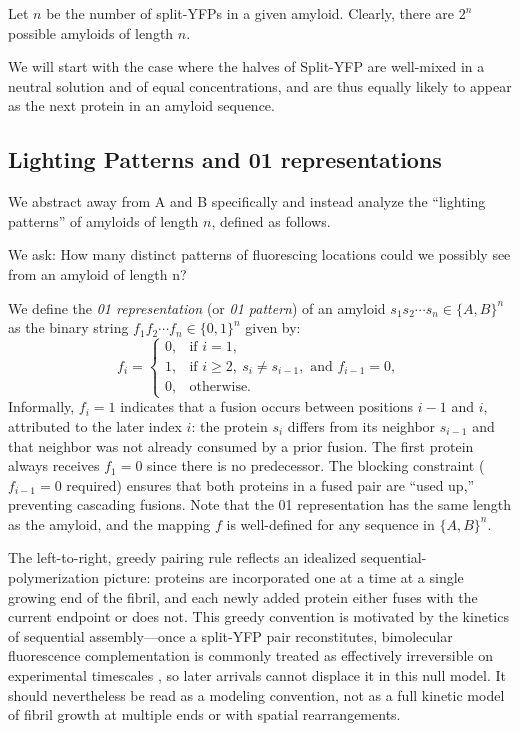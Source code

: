 \documentclass[11pt]{article}
\begin{document}
Let $n$ be the number of split-YFPs in a given amyloid. Clearly, there are $2^n$ possible amyloids of length $n$.

We will start with the case where the halves of Split-YFP are well-mixed in a neutral solution and of equal concentrations, and are thus equally likely to appear as the next protein in an amyloid sequence. 

\subsection{Lighting Patterns and 01 representations}

We abstract away from A and B specifically and instead analyze the ``lighting patterns'' of amyloids of length $n$, defined as follows.

We ask: How many distinct patterns of fluorescing locations could we possibly see from an amyloid of length n?

We define the \textit{01 representation} (or \textit{01 pattern}) of an amyloid $s_1 s_2 \cdots s_n \in \{A,B\}^n$ as the binary string $f_1 f_2 \cdots f_n \in \{0,1\}^n$ given by:
\[
f_i = \begin{cases}
0, & \text{if } i = 1, \\
1, & \text{if } i \ge 2,\ s_i \neq s_{i-1}, \text{ and } f_{i-1} = 0, \\
0, & \text{otherwise.}
\end{cases}
\]
Informally, $f_i = 1$ indicates that a fusion occurs between positions $i-1$ and $i$, attributed to the later index $i$: the protein $s_i$ differs from its neighbor $s_{i-1}$ and that neighbor was not already consumed by a prior fusion. The first protein always receives $f_1 = 0$ since there is no predecessor. The blocking constraint ($f_{i-1} = 0$ required) ensures that both proteins in a fused pair are ``used up,'' preventing cascading fusions. Note that the 01 representation has the same length as the amyloid, and the mapping $f$ is well-defined for any sequence in $\{A,B\}^n$.

The left-to-right, greedy pairing rule reflects an idealized sequential-polymerization picture: proteins are incorporated one at a time at a single growing end of the fibril, and each newly added protein either fuses with the current endpoint or does not. This greedy convention is motivated by the kinetics of sequential assembly---once a split-YFP pair reconstitutes, bimolecular fluorescence complementation is commonly treated as effectively irreversible on experimental timescales \cite{hu2002,kerppola2006}, so later arrivals cannot displace it in this null model. It should nevertheless be read as a modeling convention, not as a full kinetic model of fibril growth at multiple ends or with spatial rearrangements.
\end{document}
